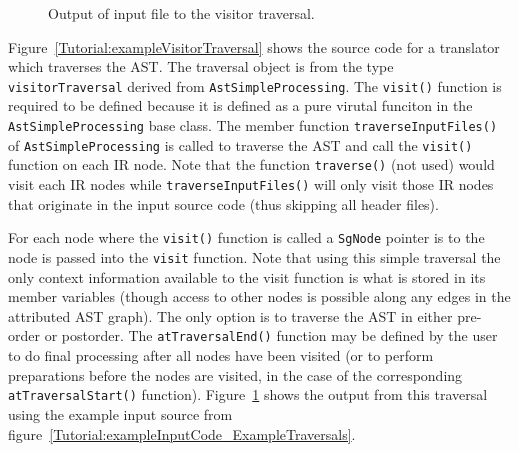 \begin{figure}[!h]
{\indent
{\mySmallFontSize


\begin{latexonly}
   
\end{latexonly}

\begin{htmlonly}
   
\end{htmlonly}

}
}
\caption{Output of input file to the visitor traversal.}
\label{Tutorial:exampleOutput_VisitorTraversal}
\end{figure}

Figure~\ref{Tutorial:exampleVisitorTraversal} shows the source code 
for a translator which traverses the AST.  The traversal object is
from the type {\tt visitorTraversal} derived from {\tt AstSimpleProcessing}.
The {\tt visit()} function is required to be defined because it is 
defined as a pure virutal funciton in the {\tt AstSimpleProcessing} base class.
The member function {\tt traverseInputFiles()} of {\tt AstSimpleProcessing} 
is called to traverse the AST and call the {\tt visit()} function on each
IR node.  Note that the function {\tt traverse()} (not used) would visit
each IR nodes while {\tt traverseInputFiles()} will only visit those
IR nodes that originate in the input source code (thus skipping all 
header files).

For each node where the {\tt visit()} function is called a {\tt SgNode} 
pointer is to the node is passed into the {\tt visit} function.
Note that using this simple traversal
the only context information available to the visit function is what is stored
in its member variables (though access to other nodes is possible along
any edges in the attributed AST graph).
The only option is to traverse the AST in either pre-order or postorder.
The {\tt atTraversalEnd()} function may be defined by the user to do final
processing after all nodes have been visited (or to perform preparations
before the nodes are visited, in the case of the corresponding {\tt
atTraversalStart()} function).
Figure~\ref{Tutorial:exampleOutput_VisitorTraversal} shows the 
output from this traversal using the example input source from 
figure~\ref{Tutorial:exampleInputCode_ExampleTraversals}.

